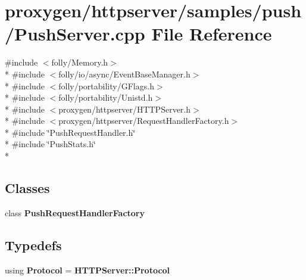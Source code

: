 \section{proxygen/httpserver/samples/push/\+Push\+Server.cpp File Reference}
\label{PushServer_8cpp}
{\ttfamily \#include $<$folly/\+Memory.\+h$>$}\\*
{\ttfamily \#include $<$folly/io/async/\+Event\+Base\+Manager.\+h$>$}\\*
{\ttfamily \#include $<$folly/portability/\+G\+Flags.\+h$>$}\\*
{\ttfamily \#include $<$folly/portability/\+Unistd.\+h$>$}\\*
{\ttfamily \#include $<$proxygen/httpserver/\+H\+T\+T\+P\+Server.\+h$>$}\\*
{\ttfamily \#include $<$proxygen/httpserver/\+Request\+Handler\+Factory.\+h$>$}\\*
{\ttfamily \#include \char`\"{}Push\+Request\+Handler.\+h\char`\"{}}\\*
{\ttfamily \#include \char`\"{}Push\+Stats.\+h\char`\"{}}\\*
\subsection*{Classes}
\begin{DoxyCompactItemize}
\item 
class {\bf Push\+Request\+Handler\+Factory}
\end{DoxyCompactItemize}
\subsection*{Typedefs}
\begin{DoxyCompactItemize}
\item 
using {\bf Protocol} = {\bf H\+T\+T\+P\+Server\+::\+Protocol}
\end{DoxyCompactItemize}
